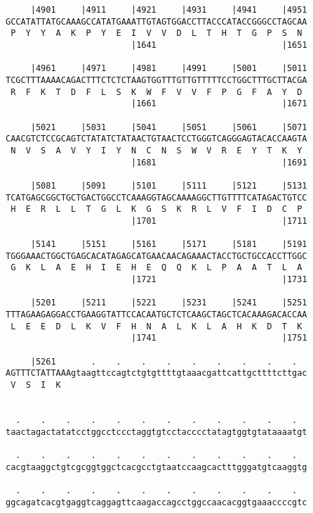 \documentclass{article}
\begin{document}
\begin{Verbatim}
     |4901     |4911     |4921     |4931     |4941     |4951
GCCATATTATGCAAAGCCATATGAAATTGTAGTGGACCTTACCCATACCGGGCCTAGCAA
 P  Y  Y  A  K  P  Y  E  I  V  V  D  L  T  H  T  G  P  S  N 
                         |1641                         |1651
  
     |4961     |4971     |4981     |4991     |5001     |5011
TCGCTTTAAAACAGACTTTCTCTCTAAGTGGTTTGTTGTTTTTCCTGGCTTTGCTTACGA
 R  F  K  T  D  F  L  S  K  W  F  V  V  F  P  G  F  A  Y  D 
                         |1661                         |1671
  
     |5021     |5031     |5041     |5051     |5061     |5071
CAACGTCTCCGCAGTCTATATCTATAACTGTAACTCCTGGGTCAGGGAGTACACCAAGTA
 N  V  S  A  V  Y  I  Y  N  C  N  S  W  V  R  E  Y  T  K  Y 
                         |1681                         |1691
  
     |5081     |5091     |5101     |5111     |5121     |5131
TCATGAGCGGCTGCTGACTGGCCTCAAAGGTAGCAAAAGGCTTGTTTTCATAGACTGTCC
 H  E  R  L  L  T  G  L  K  G  S  K  R  L  V  F  I  D  C  P 
                         |1701                         |1711
  
     |5141     |5151     |5161     |5171     |5181     |5191
TGGGAAACTGGCTGAGCACATAGAGCATGAACAACAGAAACTACCTGCTGCCACCTTGGC
 G  K  L  A  E  H  I  E  H  E  Q  Q  K  L  P  A  A  T  L  A 
                         |1721                         |1731
  
     |5201     |5211     |5221     |5231     |5241     |5251
TTTAGAAGAGGACCTGAAGGTATTCCACAATGCTCTCAAGCTAGCTCACAAAGACACCAA
 L  E  E  D  L  K  V  F  H  N  A  L  K  L  A  H  K  D  T  K 
                         |1741                         |1751
  
     |5261       .    .    .    .    .    .    .    .    .  
AGTTTCTATTAAAgtaagttccagtctgtgttttgtaaacgattcattgcttttcttgac
 V  S  I  K                                                 
                                                            
  
  .    .    .    .    .    .    .    .    .    .    .    .  
taactagactatatcctggcctccctaggtgtcctacccctatagtggtgtataaaatgt
                                                            
  .    .    .    .    .    .    .    .    .    .    .    .  
cacgtaaggctgtcgcggtggctcacgcctgtaatccaagcactttgggatgtcaaggtg
                                                            
  .    .    .    .    .    .    .    .    .    .    .    .  
ggcagatcacgtgaggtcaggagttcaagaccagcctggccaacacggtgaaaccccgtc
                                                            

\end{Verbatim}
\end{document}
